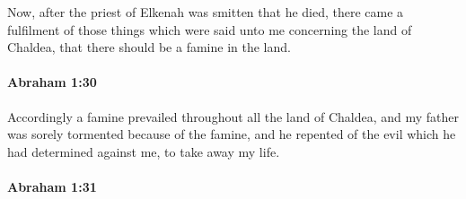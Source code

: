 			Now, after the priest of Elkenah was smitten that he died, there came a fulfilment of those things which were said unto me concerning the land of Chaldea, that there should be a famine in the land.


		\paragraph{Abraham 1:30} %
			\label{ABRAHAM-1-30}

			Accordingly a famine prevailed throughout all the land of Chaldea, and my father was sorely tormented because of the famine, and he repented of the evil which he had determined against me, to take away my life.


		\paragraph{Abraham 1:31} %
			\label{ABRAHAM-1-31}

